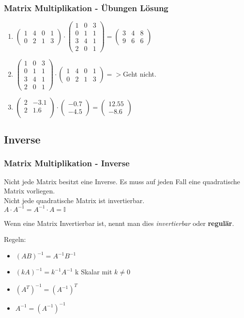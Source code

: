 \begin{frame}
\frametitle{Matrix Multiplikation - Übungen Lösung}
\begin{enumerate}
\item $ \begin{pmatrix} 
1 & 4 & 0 & 1\\ 
0 & 2 & 1 & 3 
\end{pmatrix} 
\cdot 
\begin{pmatrix} 
1 & 0 & 3 \\ 
0 & 1 & 1\\
3 & 4 & 1\\
2 & 0 & 1
\end{pmatrix} 
= 
\begin{pmatrix} 
3 & 4 & 8 \\ 
9 & 6 & 6
\end{pmatrix} $
\item 
$\begin{pmatrix} 
1 & 0 & 3 \\ 
0 & 1 & 1\\
3 & 4 & 1\\
2 & 0 & 1
\end{pmatrix} 
\cdot 
\begin{pmatrix} 
1 & 4 & 0 & 1\\ 
0 & 2 & 1 & 3 
\end{pmatrix} 
=> $Geht nicht.
\item
$\begin{pmatrix}
2 & -3.1 \\
2 & 1.6 \\
\end{pmatrix}
\cdot
\begin{pmatrix}
-0.7 \\
-4.5 
\end{pmatrix}
=
\begin{pmatrix}
12.55 \\
-8.6
\end{pmatrix}$
\end{enumerate}
\end{frame}

\subsection{Inverse}
\begin{frame}
\frametitle{Matrix Multiplikation - Inverse}
Nicht jede Matrix besitzt eine Inverse. Es muss auf jeden Fall eine quadratische Matrix vorliegen.\\
Nicht jede quadratische Matrix ist invertierbar.\\
$A\cdot A^{-1} = A^{-1}\cdot A = \mathbb{I}$

Wenn eine Matrix Invertierbar ist, nennt man dies \textit{invertierbar} oder \textbf{regulär}.

Regeln:
\begin{itemize}
\item $(AB)^{-1} = A^{-1}B^{-1}$
\item $(kA)^{-1} = k^{-1}A^{-1}$ k Skalar mit $k\neq0$
\item $(A^T)^{-1} = (A^{-1})^T$
\item $A^{-1} = (A^{-1})^{-1}$
\end{itemize}
\end{frame}

